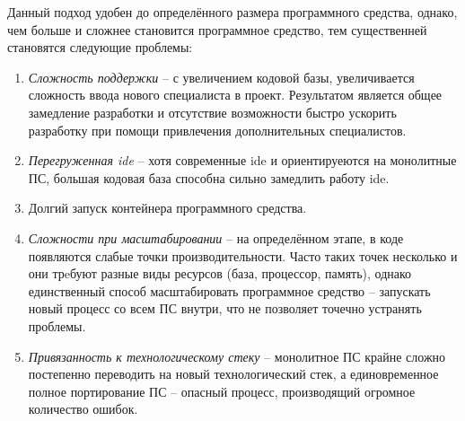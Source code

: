 Данный подход удобен до определённого размера программного средства, однако, чем больше и сложнее становится программное средство, тем существенней становятся следующие проблемы:

\begin{enumerate}
	\item \emph{Сложность поддержки} -- с увеличением кодовой базы, увеличивается сложность ввода нового специалиста в проект. Результатом является общее замедление разработки и отсутствие возможности быстро ускорить разработку при помощи привлечения дополнительных специалистов.
	\item \emph{Перегруженная \gls{ide}} -- хотя современные \gls{ide} и ориентируеются на монолитные ПС, большая кодовая база способна сильно замедлить работу \gls{ide}.
	\item Долгий запуск контейнера программного средства.
	\item \emph{Сложности при масштабировании} -- на определённом этапе, в коде появляются слабые точки производительности. Часто таких точек несколько и они трeбуют разные виды ресурсов (база, процессор, память), однако единственный способ масштабировать программное средство -- запускать новый процесс со всем ПС внутри, что не позволяет точечно устранять проблемы.
	\item \emph{Привязанность к технологическому стеку} -- монолитное ПС крайне сложно постепенно переводить на новый технологический стек, а единовременное полное портирование ПС -- опасный процесс, производящий огромное количество ошибок.
\end{enumerate}